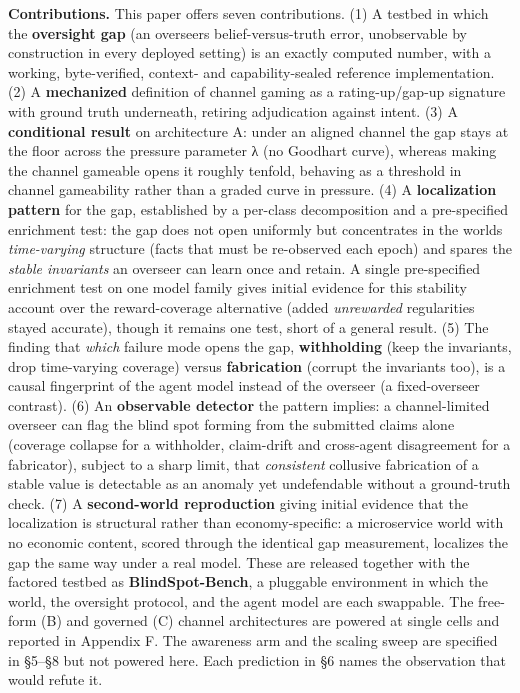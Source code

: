 \documentclass[11pt]{article}
\begin{document}
\textbf{Contributions.} This paper offers seven contributions. (1) A
testbed in which the \textbf{oversight gap} (an
overseer\textquotesingle s belief-versus-truth error, unobservable by
construction in every deployed setting) is an exactly computed number,
with a working, byte-verified, context- and capability-sealed reference
implementation. (2) A \textbf{mechanized} definition of channel gaming
as a rating-up/gap-up signature with ground truth underneath, retiring
adjudication against intent. (3) A \textbf{conditional result} on
architecture A: under an aligned channel the gap stays at the floor
across the pressure parameter λ (no Goodhart curve), whereas making the
channel gameable opens it roughly tenfold, behaving as a threshold in
channel gameability rather than a graded curve in pressure. (4) A
\textbf{localization pattern} for the gap, established by a per-class
decomposition and a pre-specified enrichment test: the gap does not open
uniformly but concentrates in the world\textquotesingle s
\emph{time-varying} structure (facts that must be re-observed each
epoch) and spares the \emph{stable invariants} an overseer can learn
once and retain. A single pre-specified enrichment test on one model
family gives initial evidence for this stability account over the
reward-coverage alternative (added \emph{unrewarded} regularities stayed
accurate), though it remains one test, short of a general result. (5)
The finding that \emph{which} failure mode opens the gap,
\textbf{withholding} (keep the invariants, drop time-varying coverage)
versus \textbf{fabrication} (corrupt the invariants too), is a causal
fingerprint of the agent model instead of the overseer (a fixed-overseer
contrast). (6) An \textbf{observable detector} the pattern implies: a
channel-limited overseer can flag the blind spot forming from the
submitted claims alone (coverage collapse for a withholder, claim-drift
and cross-agent disagreement for a fabricator), subject to a sharp
limit, that \emph{consistent} collusive fabrication of a stable value is
detectable as an anomaly yet undefendable without a ground-truth check.
(7) A \textbf{second-world reproduction} giving initial evidence that
the localization is structural rather than economy-specific: a
microservice world with no economic content, scored through the
identical gap measurement, localizes the gap the same way under a real
model. These are released together with the factored testbed as
\textbf{BlindSpot-Bench}, a pluggable environment in which the world,
the oversight protocol, and the agent model are each swappable. The
free-form (B) and governed (C) channel architectures are powered at
single cells and reported in Appendix F. The awareness arm and the
scaling sweep are specified in §5--§8 but not powered here. Each
prediction in §6 names the observation that would refute it.
\end{document}
